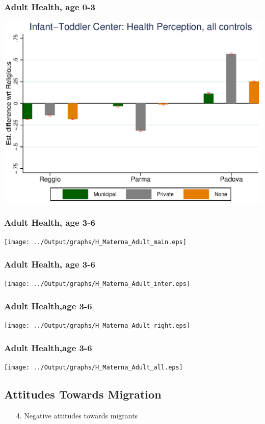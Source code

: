 \documentclass{beamer}
\begin{document}
\begin{frame}\frametitle{Adult Health, age 0-3}
\center
\includegraphics[scale=0.7]{../Output/graphs/H_Asilo_Adult_all.eps}
\end{frame}


\begin{frame}\frametitle{Adult Health, age 3-6}
\center
\texttt{[image: ../Output/graphs/H\_Materna\_Adult\_main.eps]}
\end{frame}

\begin{frame}\frametitle{Adult Health, age 3-6}
\center
\texttt{[image: ../Output/graphs/H\_Materna\_Adult\_inter.eps]}
\end{frame}

\begin{frame}\frametitle{Adult Health,age 3-6}
\center
\texttt{[image: ../Output/graphs/H\_Materna\_Adult\_right.eps]}
\end{frame}

\begin{frame}\frametitle{Adult Health,age 3-6}
\center
\texttt{[image: ../Output/graphs/H\_Materna\_Adult\_all.eps]}
\end{frame}

\subsection{Attitudes Towards Migration}
\begin{frame}
\begin{itemize}
	\centering
	\item[4.] Negative attitudes towards migrants
\end{itemize}
\end{frame}
\end{document}
